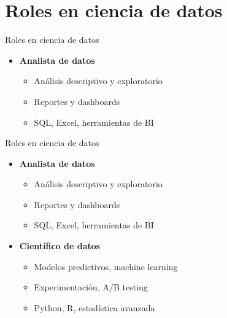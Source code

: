 \documentclass{beamer}
\begin{document}
\section{Roles en ciencia de datos}

\begin{frame}{Roles en ciencia de datos}
\begin{itemize}
    \item \textbf{Analista de datos}
    \begin{itemize}
        \item Análisis descriptivo y exploratorio
        \item Reportes y dashboards
        \item SQL, Excel, herramientas de BI
    \end{itemize}
\end{itemize}
\end{frame}

\begin{frame}{Roles en ciencia de datos}
\begin{itemize}
    \item \textbf{Analista de datos}
    \begin{itemize}
        \item Análisis descriptivo y exploratorio
        \item Reportes y dashboards
        \item SQL, Excel, herramientas de BI
    \end{itemize}
    
    \item \textbf{Científico de datos}
    \begin{itemize}
        \item Modelos predictivos, machine learning
        \item Experimentación, A/B testing
        \item Python, R, estadística avanzada
    \end{itemize}
\end{itemize}
\end{frame}
\end{document}
